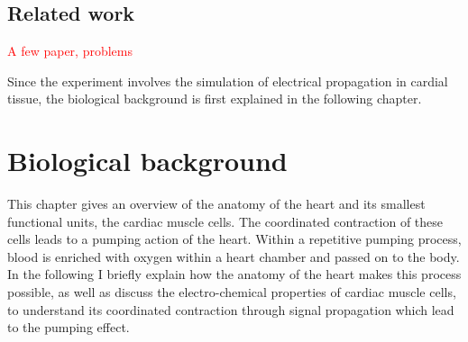

\subsection{Related work}
\textcolor{red}{A few paper, problems}

Since the experiment involves the simulation of electrical propagation in cardial tissue, the biological background is first explained in the following chapter. 



\section{Biological background}
This chapter gives an overview of the anatomy of the heart and its smallest functional units, the cardiac muscle cells. The coordinated contraction of these cells leads to a pumping action of the heart. Within a repetitive pumping process, blood is enriched with oxygen within a heart chamber and passed on to the body. In the following I briefly explain how the anatomy of the heart makes this process possible, as well as discuss the electro-chemical properties of cardiac muscle cells, to understand its coordinated contraction through signal propagation which lead to the pumping effect.


